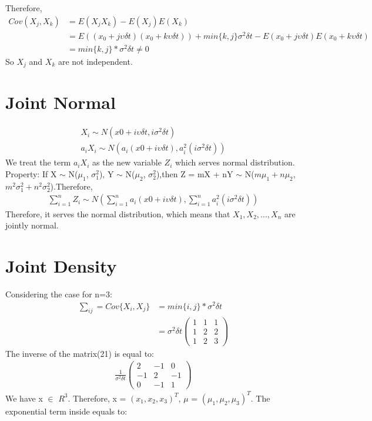 \documentclass[twoside,11pt]{article}
\begin{document}
Therefore, 
\begin{equation}
    \begin{split}
        Cov(X_{j}, X_{k}) &= E(X_{j}X_{k})-E(X_{j})E(X_{k})\\
        &= E((x_{0}+ j\upsilon\delta t)(x_{0} +k\upsilon\delta t)) + min\{k,j\}\sigma^{2}\delta t - E(x_{0} + j\upsilon\delta t)E(x_{0} + k\upsilon\delta t)\\
        &=  min\{k,j\}*\sigma^{2}\delta t \neq 0 
    \end{split}
\end{equation}
So $X_{j}$ and $X_{k}$ are not independent.

\section{Joint Normal}
\begin{align}
    X_{i} \sim N(x0 + i\upsilon\delta t, i\sigma^{2}\delta t)\\
    a_{i}X_{i} \sim N(a_{i}(x0 + i\upsilon\delta t), a_{i}^{2}(i\sigma^{2}\delta t))
\end{align}
We treat the term $a_{i}X_{i}$ as the new variable $Z_{i}$ which serves normal distribution. \\
Property: If X $\sim$ N($\mu_{1}$, $\sigma_{1}^{2}$), Y $\sim$ N($\mu_{2}$, $\sigma_{2}^{2}$),then Z = mX + nY $\sim$ N($m\mu_{1}+n\mu_{2}$, $m^{2}\sigma_{1}^{2}+n^{2}\sigma_{2}^{2}$).Therefore,
\begin{align}
    \sum_{i=1}^{n}Z_{i} \sim N(\sum_{i=1}^{n}a_{i}(x0 + i\upsilon\delta t),\sum_{i=1}^{n}a_{i}^{2}(i\sigma^{2}\delta t))
\end{align}
Therefore, it serves the normal distribution, which means that $X_{1}, X_{2},...,X_{n}$ are jointly normal.


\section{Joint Density}
Considering the case for n=3:
\begin{equation}
    \begin{split}
    \sum_{ij} = Cov\{X_{i}, X_{j}\} &= 
    min\{i,j\}*\sigma^{2}\delta t\\
    &= \sigma^{2}\delta t
\left (
\begin{matrix}
1 & 1 & 1 \\
1 & 2 & 2 \\
1 & 2 & 3
\end{matrix}
\right )
    \end{split}
\end{equation}
The inverse of the matrix(21) is equal to:
\begin{align}
    \frac{1}{\sigma^{2}\delta t}
    \left (
\begin{matrix}
2 & -1 & 0 \\
-1 & 2 & -1 \\
0 & -1 & 1 
\end{matrix}
\right )
\end{align}
We have x $\in$ $R^{3}$. Therefore, x = $(x_{1}, x_{2},x_{3})^{T}$, $\mu$ = $(\mu_{1}, \mu_{2}, \mu_{3})^{T}$. The  exponential term inside equals to:
\end{document}
